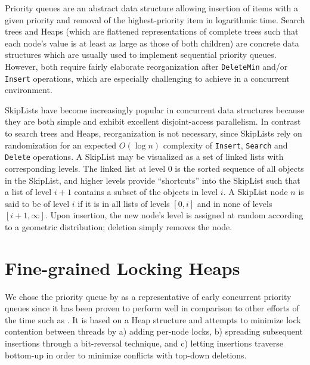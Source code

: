 \documentclass[a4paper,10pt]{article}
\begin{document}

Priority queues are an abstract data structure allowing insertion of items with a given priority
and removal of the highest-priority item in logarithmic time. Search trees and Heaps (which are 
flattened representations of complete trees such that each node's value is at least as large as
those of both children) are concrete data structures which are usually used to implement sequential
priority queues. However, both require fairly elaborate reorganization after \lstinline|DeleteMin|
and/or \lstinline|Insert| operations, which are especially challenging to achieve in a concurrent
environment. 


SkipLists \cite{pugh1990skip} have become increasingly popular in concurrent data structures because 
they are both simple and exhibit excellent disjoint-access parallelism. In contrast to
search trees and Heaps, reorganization is not necessary, since SkipLists rely on
randomization for an expected $O(\log n)$ complexity of \lstinline|Insert|, \lstinline|Search|
and \lstinline|Delete| operations.
A SkipList may be visualized as a set of linked lists with corresponding levels. The linked
list at level 0 is the sorted sequence of all objects in the SkipList,
and higher levels provide ``shortcuts''
into the SkipList such that a list of level $i + 1$ contains a subset of the objects in level
$i$. A SkipList node $n$ is said to be of level $i$ if it is in all lists of levels $[0, i]$
and in none of levels $[i + 1, \infty]$. Upon insertion, the new node's level is assigned at random
according to a geometric distribution; deletion simply removes the node.

\section{Fine-grained Locking Heaps}

We chose the priority queue by \citeauthor{hunt1996efficient} \cite{hunt1996efficient}
as a representative of early concurrent priority queues since it has been proven to
perform well \cite{shavit2000skiplist} in comparison to other efforts of the time such as \cite{nageshwara1988concurrent,ayani1990lr,yan1998lock}. %
It is based on a Heap
structure and attempts to minimize lock contention between threads by a) adding per-node
locks, b) spreading subsequent insertions through a bit-reversal technique, %
and c) letting insertions traverse bottom-up in order to minimize conflicts with
top-down deletions.
\end{document}
